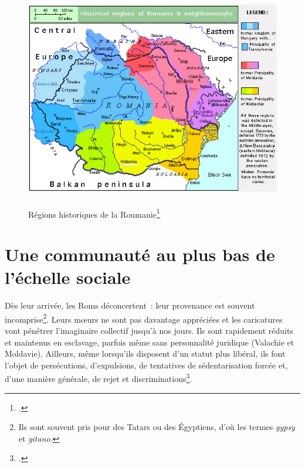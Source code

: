 \documentclass[a4paper,12pt,twoside]{book}
\begin{document}
			\begin{figure}[!ht]
    			\centering
                \includegraphics[width=13cm,height=9.5cm]{images/RomaniaHistRegions.jpg}
                \caption{Régions historiques de la Roumanie\footcite{pazdzioraHistoricalRegionsRomania2009}}
                \label{fig1}
            \end{figure}
		\vspace{-0.8cm}	    
		\section*{Une communauté au plus bas de l'échelle sociale}
		    Dès leur arrivée, les Roms déconcertent~: leur provenance est souvent incomprise\footnote{Ils sont souvent pris pour des Tatars ou des Égyptiens, d'où les termes \og{}\textit{gypsy}\fg{} et \og{}\textit{gitano}\fg{}.}. Leurs mœurs ne sont pas davantage appréciées et les caricatures vont pénétrer l'imaginaire collectif jusqu'à nos jours. Ils sont rapidement réduits et maintenus en esclavage, parfois même sans personnalité juridique (Valachie et Moldavie). Ailleurs, même lorsqu'ils disposent d'un statut plus libéral, ils font l'objet de persécutions, d'expulsions, de tentatives de sédentarisation forcée et, d'une manière générale, de rejet et discriminations\footcites(Voir~: )(){marushiakovaGypsySlaveryWallachia2013}[][pp.~13-65 et 69-85]{achimRomaRomanianHistory2004}{hancockPariahSyndromeAccount1987}{soulisGypsiesByzantineEmpire1961}{beckOriginsGipsySlavery1989}.
		    
\end{document}
